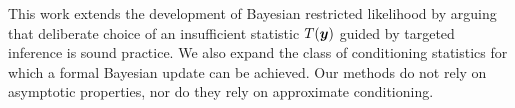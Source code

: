\documentclass[ba]{imsart}
\def\bth{\mbox{\boldmath $\theta$}}
\newcommand{\by}{\mbox{\boldmath $y$}}
\newcommand{\bz}{\mbox{\boldmath $z$}}
\newcommand{\green}[1]{{\color{green}#1}}
\begin{document}



This work extends the development of Bayesian restricted likelihood by arguing that deliberate choice of an insufficient statistic $T(\by)$ guided by targeted inference is sound practice. We also expand the class of conditioning statistics for which a formal Bayesian update can be achieved.  Our methods do not rely on asymptotic properties, nor do they rely on approximate conditioning.%
\end{document}
